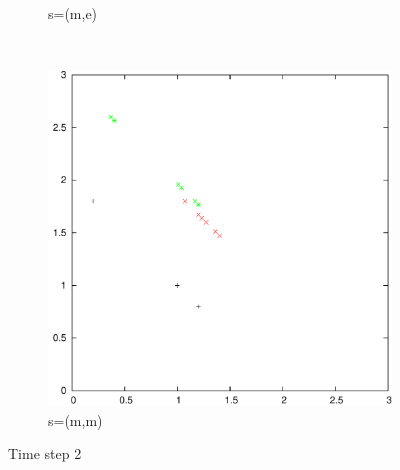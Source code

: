 \documentclass{article}
\begin{document}
\begin{figure}
\begin{subfigure}[b]{0.3\textwidth}
			\caption{s=(m,e)}
			\label{fig:t2s1}
		\end{subfigure}
		~
		\begin{subfigure}[b]{0.3\textwidth}
			\centering
			\includegraphics[width=\textwidth]{images/t2s3}
			\caption{s=(m,m)}
			\label{fig:t2s3}
		\end{subfigure}
		\caption{Time step 2}
		\label{fig:t2}
	\end{figure}
\end{document}
